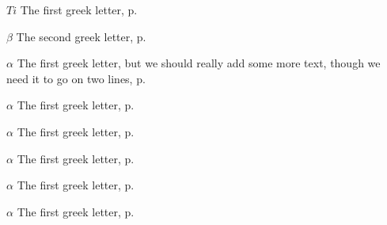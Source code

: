 \begin{eqlist}

\item[$Ti$]
The first greek letter, p. \pageref{beta}

\item[$\beta$]
The second greek letter, p.~\pageref{}

\item[$\alpha$]
The first greek letter, but we should really add some more text, though we need it to go on two lines, p.~\pageref{}

\item[$\alpha$]
The first greek letter, p.~\pageref{}

\item[$\alpha$]
The first greek letter, p.~\pageref{}

\item[$\alpha$]
The first greek letter, p.~\pageref{}

\item[$\alpha$]
The first greek letter, p.~\pageref{}

\item[$\alpha$]
The first greek letter, p.~\pageref{}

\end{eqlist}